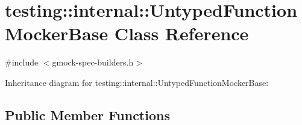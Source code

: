 \hypertarget{classtesting_1_1internal_1_1_untyped_function_mocker_base}{}\section{testing\+:\+:internal\+:\+:Untyped\+Function\+Mocker\+Base Class Reference}
\label{classtesting_1_1internal_1_1_untyped_function_mocker_base}


{\ttfamily \#include $<$gmock-\/spec-\/builders.\+h$>$}



Inheritance diagram for testing\+:\+:internal\+:\+:Untyped\+Function\+Mocker\+Base\+:
\subsection*{Public Member Functions}
